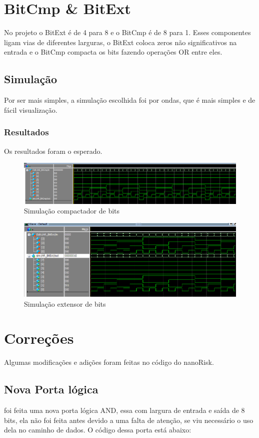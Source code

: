 \documentclass[a4paper, 10pt]{article}
\begin{document}
\section{BitCmp \& BitExt}
No projeto o BitExt é de 4 para 8 e o BitCmp é de 8 para 1.
Esses componentes ligam vias de diferentes larguras, o BitExt coloca zeros não significativos na entrada e o BitCmp compacta os bits fazendo operações OR entre eles.

\subsection{Simulação}
Por ser mais simples, a simulação escolhida foi por ondas, que é mais simples e de fácil visualização.
\subsubsection{Resultados}
Os resultados foram o esperado.
\begin{figure}[H]
	\centering
	\includegraphics[scale=0.7]{simuCMP.PNG}
	\caption{Simulação compactador de bits}
	\label{Rotulo}
\end{figure}
\begin{figure}[H]
	\centering
	\includegraphics[scale=0.7]{simuEXT.PNG}
	\caption{Simulação extensor de bits}
	\label{Rotulo}
\end{figure}
\section{Correções}
Algumas modificações e adições foram feitas no código do nanoRisk.
\subsection{Nova Porta lógica}
foi feita uma nova porta lógica AND, essa com largura de entrada e saída de 8 bits, ela não foi feita antes devido a uma falta de atenção, se viu necessário o uso dela no caminho de dados. O código dessa porta está abaixo:

\end{document}
